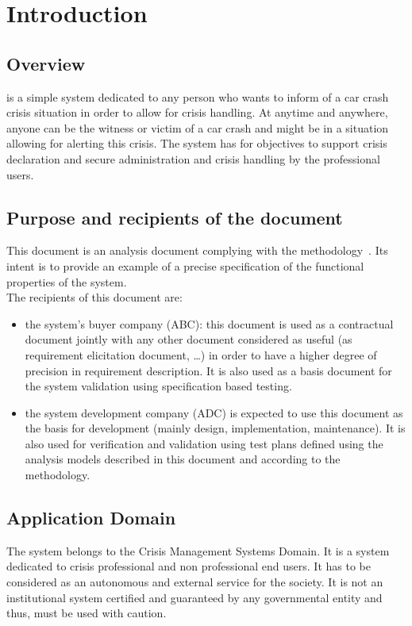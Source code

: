 
\chapter{Introduction}
\label{chap:introduction}

\section{Overview}
\msricrash is a simple system dedicated to any person who wants to inform of a
car crash crisis situation in order to allow for crisis handling.
At anytime and anywhere, anyone can be the witness or victim of a car crash and might be
in a situation allowing for alerting this crisis. 
The \msricrash system has for objectives to support crisis declaration and secure administration and crisis handling by the \msricrash professional users. 

\section{Purpose and recipients of the document}
This document is an analysis document complying with the \msrmessir
methodology~\cite{messirbook}. Its intent is to provide an example of a precise
specification of the functional properties of the \msricrash system. \\

The recipients of this document are:
\begin{itemize}
\item the \msricrash system's buyer company (ABC): this document is used as a
contractual document jointly with any other document considered as useful (as
requirement elicitation document, \ldots) in order to have a higher degree of
precision in requirement description. It is also used as a basis document
for the \msricrash system validation using specification based testing.
\item the \msricrash system development company (ADC) is expected to use this document as
the basis for development (mainly design, implementation, maintenance). It is also
 used for verification and validation using test plans defined using the
analysis models described in this document and according to the \msrmessir methodology.
 
\end{itemize} 

 
\section{Application Domain}
The \msricrash system belongs to the Crisis Management Systems Domain. It is a
system dedicated to crisis professional and non professional end users. It has
to be considered as an autonomous and external service for the society. 
It is not an institutional system certified and guaranteed by any governmental
entity and thus, must be used with caution.

